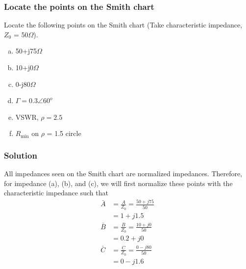 \begin{exmp}\label{exmp:locatepoints}
\subsubsection*{Locate the points on the Smith chart}
Locate the following points on the Smith chart (Take characteristic impedance, $Z_{0}$ = 50$\Omega$).

\begin{enumerate}[(a)]
\item 50+j75$\varOmega$
\item 10+j0$\varOmega$
\item 0-j80$\varOmega$
\item $\Gamma=0.3\angle60^o$
\item VSWR, $\rho=2.5$
\item $R_\min$ on $\rho$ = 1.5 circle
\end{enumerate}

\subsubsection*{Solution}
All impedances seen on the Smith chart are normalized impedances. Therefore, for impedance (a), (b), and (c), we will first normalize these points with the characteristic impedance such that
\begin{align*}
\bar{A}&=\frac{A}{Z_{0}}
=\frac{50 + j75}{50}\\
&=1+j1.5\\
\bar{B}&=\frac{B}{Z_{0}}
= \frac{10 + j0}{50}\\
&=0.2+j0\\
\bar{C}&=\frac{C}{Z_{0}}
= \frac{0 - j80}{50}\\
&=0-j1.6
\end{align*}


\end{exmp}
